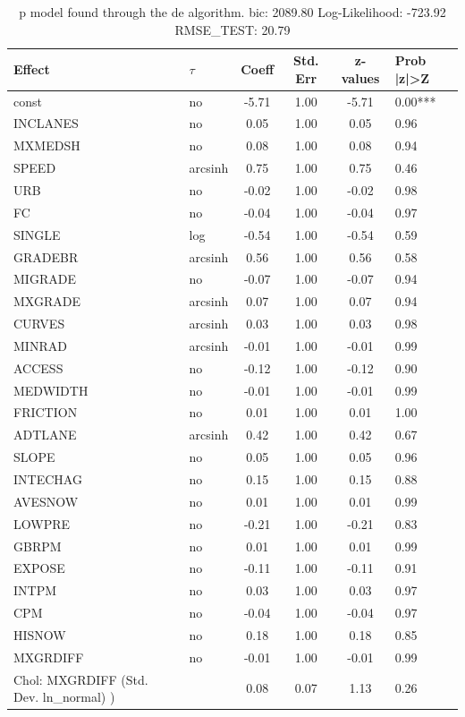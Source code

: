 \begin{table}
	\caption{p model found through the de algorithm. bic: 2089.80 Log-Likelihood: -723.92 RMSE_TEST: 20.79}
	\begin{center}
		\begin{tabular}{|l|l|c|c|c|l|}
			\hline
			Effect & $\tau$ & Coeff & Std. Err & z-values & Prob |z|>Z \\
			\hline
			const & no & -5.71 & 1.00 & -5.71 & 0.00*** \\
			\hline
			INCLANES & no & 0.05 & 1.00 & 0.05 & 0.96 \\
			\hline
			MXMEDSH & no & 0.08 & 1.00 & 0.08 & 0.94 \\
			\hline
			SPEED & arcsinh & 0.75 & 1.00 & 0.75 & 0.46 \\
			\hline
			URB & no & -0.02 & 1.00 & -0.02 & 0.98 \\
			\hline
			FC & no & -0.04 & 1.00 & -0.04 & 0.97 \\
			\hline
			SINGLE & log & -0.54 & 1.00 & -0.54 & 0.59 \\
			\hline
			GRADEBR & arcsinh & 0.56 & 1.00 & 0.56 & 0.58 \\
			\hline
			MIGRADE & no & -0.07 & 1.00 & -0.07 & 0.94 \\
			\hline
			MXGRADE & arcsinh & 0.07 & 1.00 & 0.07 & 0.94 \\
			\hline
			CURVES & arcsinh & 0.03 & 1.00 & 0.03 & 0.98 \\
			\hline
			MINRAD & arcsinh & -0.01 & 1.00 & -0.01 & 0.99 \\
			\hline
			ACCESS & no & -0.12 & 1.00 & -0.12 & 0.90 \\
			\hline
			MEDWIDTH & no & -0.01 & 1.00 & -0.01 & 0.99 \\
			\hline
			FRICTION & no & 0.01 & 1.00 & 0.01 & 1.00 \\
			\hline
			ADTLANE & arcsinh & 0.42 & 1.00 & 0.42 & 0.67 \\
			\hline
			SLOPE & no & 0.05 & 1.00 & 0.05 & 0.96 \\
			\hline
			INTECHAG & no & 0.15 & 1.00 & 0.15 & 0.88 \\
			\hline
			AVESNOW & no & 0.01 & 1.00 & 0.01 & 0.99 \\
			\hline
			LOWPRE & no & -0.21 & 1.00 & -0.21 & 0.83 \\
			\hline
			GBRPM & no & 0.01 & 1.00 & 0.01 & 0.99 \\
			\hline
			EXPOSE & no & -0.11 & 1.00 & -0.11 & 0.91 \\
			\hline
			INTPM & no & 0.03 & 1.00 & 0.03 & 0.97 \\
			\hline
			CPM & no & -0.04 & 1.00 & -0.04 & 0.97 \\
			\hline
			HISNOW & no & 0.18 & 1.00 & 0.18 & 0.85 \\
			\hline
			MXGRDIFF & no & -0.01 & 1.00 & -0.01 & 0.99 \\
			\hline
			 Chol: MXGRDIFF (Std. Dev. ln_normal) ) &  & 0.08 & 0.07 & 1.13 & 0.26 \\
			\hline
		\end{tabular}
	\end{center}
\end{table}
